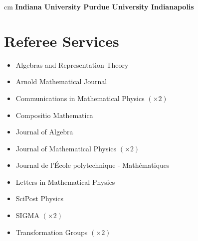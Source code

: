 \documentclass[11pt,letterpaper,roman,colorlinks,urlcolor=teal,linkcolor=teal]{moderncv} %
\begin{document}
 cm \textbf{Indiana University Purdue University Indianapolis}
\vskip 0.2cm 


\section{Referee Services}

\begin{itemize}[parsep=-0.2em, leftmargin=3.55cm]
    \item Algebras and Representation Theory
    \item Arnold Mathematical Journal
    \item Communications in Mathematical Physics $(\times 2)$
    \item Compositio Mathematica
    \item Journal of Algebra
    \item Journal of Mathematical Physics $(\times 2)$
    \item Journal de l'École polytechnique - Mathématiques 
    \item Letters in Mathematical Physics
    \item SciPost Physics
    \item SIGMA $(\times 2)$
    \item Transformation Groups $(\times 2)$
\end{itemize}





\end{document}
